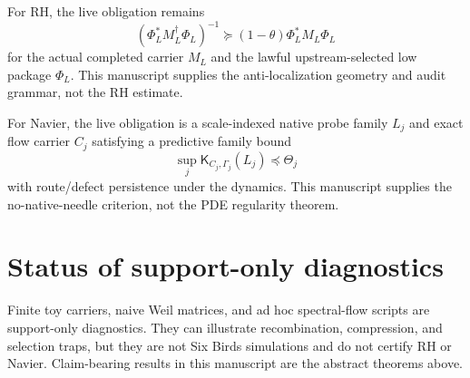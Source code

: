 \documentclass[11pt]{article}
\newcommand{\Kmat}{\mathsf K}
\begin{document}
For RH, the live obligation remains
\[
\boxed{(\Phi_L^*M_L^\dagger\Phi_L)^{-1}\succeq(1-\theta)\Phi_L^*M_L\Phi_L}
\]
for the actual completed carrier $M_L$ and the lawful upstream-selected low package $\Phi_L$.  This manuscript supplies the anti-localization geometry and audit grammar, not the RH estimate.

For Navier, the live obligation is a scale-indexed native probe family $L_j$ and exact flow carrier $C_j$ satisfying a predictive family bound
\[
\sup_j \Kmat_{C_j,\Gamma_j}(L_j)\preceq\Theta_j
\]
with route/defect persistence under the dynamics.  This manuscript supplies the no-native-needle criterion, not the PDE regularity theorem.

\section{Status of support-only diagnostics}

Finite toy carriers, naive Weil matrices, and ad hoc spectral-flow scripts are support-only diagnostics.  They can illustrate recombination, compression, and selection traps, but they are not Six Birds simulations and do not certify RH or Navier.  Claim-bearing results in this manuscript are the abstract theorems above.
\end{document}
